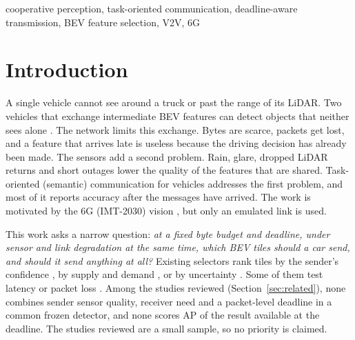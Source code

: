 \documentclass[conference]{IEEEtran}
\begin{document}
\begin{IEEEkeywords}
cooperative perception, task-oriented communication, deadline-aware transmission, BEV feature selection, V2V, 6G
\end{IEEEkeywords}

\section{Introduction}
A single vehicle cannot see around a truck or past the range of its LiDAR. Two vehicles that exchange intermediate BEV features can detect objects that neither sees alone \cite{xu2022opv2v,lu2024heal}. The network limits this exchange. Bytes are scarce, packets get lost, and a feature that arrives late is useless because the driving decision has already been made. The sensors add a second problem. Rain, glare, dropped LiDAR returns and short outages lower the quality of the features that are shared. Task-oriented (semantic) communication for vehicles \cite{feng2025,cao2025,sheng2026,liu2025,hu2026prag} addresses the first problem, and most of it reports accuracy after the messages have arrived. The work is motivated by the 6G (IMT-2030) vision \cite{itu2023}, but only an emulated link is used.

This work asks a narrow question: \emph{at a fixed byte budget and deadline, under sensor and link degradation at the same time, which BEV tiles should a car send, and should it send anything at all?} Existing selectors rank tiles by the sender's confidence \cite{hu2022where2comm}, by supply and demand \cite{xu2025cosdh}, or by uncertainty \cite{mukhopadhyay2026}. Some of them test latency or packet loss \cite{mukhopadhyay2026,wang2025jigsaw}. Among the studies reviewed (Section~\ref{sec:related}), none combines sender sensor quality, receiver need and a packet-level deadline in a common frozen detector, and none scores AP of the result available at the deadline. The studies reviewed are a small sample, so no priority is claimed.
\end{document}
